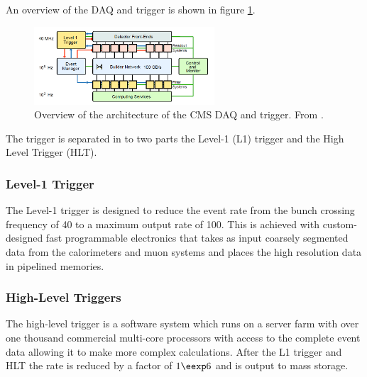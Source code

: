An overview of the DAQ and trigger is shown in figure \ref{fig:CMSDAQ}.

\begin{figure}[htb!]
  \centering
  \includegraphics[width=0.6\textwidth]{CMSDAQ}
  \caption{Overview of the architecture of the CMS DAQ and trigger. From
  \label{fig:CMSDAQ}
\cite{cms}.}
\end{figure}

The trigger is separated in to two parts the Level-1 (L1) trigger and the High
Level Trigger (HLT).\cite{cms}

\subsubsection{Level-1 Trigger}




The Level-1 trigger is designed to reduce the event rate from the bunch
crossing frequency of \unit{40}{\mega\hertz} to a maximum output rate of
\unit{100}{\kilo\hertz}.
This is achieved with custom-designed fast programmable electronics that takes
as input coarsely segmented data from the calorimeters and muon systems and
places the high resolution data in pipelined memories.



\subsubsection{High-Level Triggers}
The high-level trigger is a software system which runs on a server farm with
over one thousand commercial multi-core processors with access to the complete
event data allowing it to make more complex calculations. After the L1 trigger
and HLT the rate is reduced by a factor of $1 \eexp 6$ and is output to mass
storage.\cite{cms}

